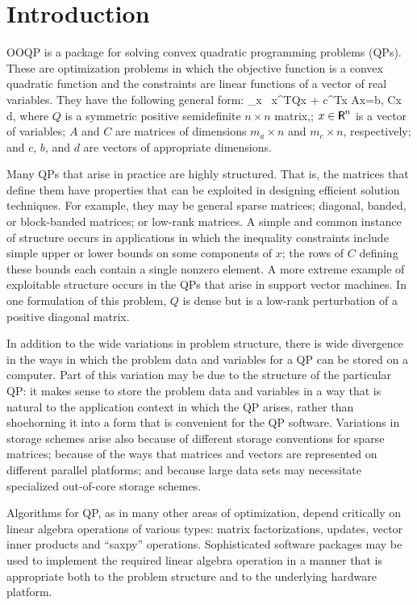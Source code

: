 \section{Introduction}

OOQP is a package for solving convex quadratic programming problems
(QPs). These are  optimization problems in which the objective function
is a convex quadratic function and the constraints are linear
functions of a vector of real variables. They have the following general
form:
\beq 
\label{qpintro}
\label{qp}
\min_x \, \half x^TQx + c^Tx \;\;  \;\;  
Ax=b, \; Cx \ge d,
\eeq
%
where $Q$ is a symmetric positive semidefinite $n \times n$ matrix,; $x
\in \R^n$ is a vector of variables; $A$ and $C$ are matrices of
dimensions $m_a \times n$ and $m_c \times n$, respectively; and $c$,
$b$, and $d$ are vectors of appropriate dimensions.

Many QPs that arise in practice are highly structured. That is, the
matrices that define them have properties that can be exploited in
designing efficient solution techniques. For example, they may be
general sparse matrices; diagonal, banded, or block-banded matrices;
or low-rank matrices. A simple and common instance of structure occurs
in applications in which the inequality constraints include simple
upper or lower bounds on some components of $x$; the rows of $C$
defining these bounds each contain a single nonzero element. A more
extreme example of exploitable structure occurs in the QPs that arise
in support vector machines. In one formulation of this problem, $Q$ is
dense but is a low-rank perturbation of a positive diagonal matrix.

In addition to the wide variations in problem structure, there is wide
divergence in the ways in which the problem data and variables for a
QP can be stored on a computer. Part of this variation may be due to
the structure of the particular QP: it makes sense to store the
problem data and variables in a way that is natural to the application
context in which the QP arises, rather than shoehorning it into a form
that is convenient for the QP software. Variations in storage schemes
arise also because of different storage conventions for sparse
matrices; because of the ways that matrices and vectors are
represented on different parallel platforms; and because large data
sets may necessitate specialized out-of-core storage schemes.

Algorithms for QP, as in many other areas of optimization, depend
critically on linear algebra operations of various types: matrix
factorizations, updates, vector inner products and ``saxpy''
operations.  Sophisticated software packages may be used to implement
the required linear algebra operation in a manner that is appropriate
both to the problem structure and to the underlying hardware platform.

